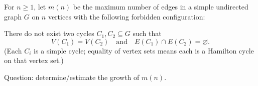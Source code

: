 For $n\ge 1$, let $m(n)$ be the maximum number of edges in a simple undirected graph $G$ on $n$ vertices with the following forbidden configuration:

There do not exist two cycles $C_1,C_2\subseteq G$ such that
\[
V(C_1)=V(C_2)\quad\text{and}\quad E(C_1)\cap E(C_2)=\varnothing.
\]
(Each $C_i$ is a simple cycle; equality of vertex sets means each is a Hamilton cycle on that vertex set.)

Question: determine/estimate the growth of $m(n)$.
